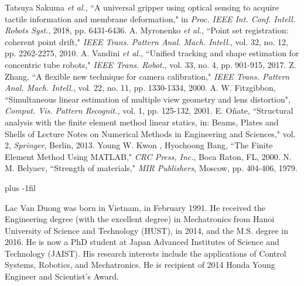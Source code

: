 \documentclass[10pt,letterpaper,journal,final,twoside,twocolumn,nofonttune]{IEEEtran}
\begin{document}
\begin{thebibliography}{1}
Tatsuya Sakuma \emph{et al.}, ``A universal gripper using optical sensing to acquire tactile information and membrane deformation," in \emph{Proc. IEEE Int. Conf. Intell. Robots Syst.}, 2018, pp. 6431-6436.
A. Myronenko \emph{et al.}, ``Point set registration: coherent point drift," \emph{IEEE Trans. Pattern Anal. Mach. Intell.}, vol. 32, no. 12, pp. 2262-2275, 2010.
A. Vandini \emph{et al.}, ``Unified tracking and shape estimation for concentric tube robots," \emph{IEEE Trans. Robot.}, vol. 33, no. 4, pp. 901-915, 2017.
Z. Zhang, ``A flexible new technique for camera calibration," \emph{IEEE Trans. Pattern Anal. Mach. Intell.}, vol. 22, no. 11, pp. 1330-1334, 2000.
A. W. Fitzgibbon, ``Simultaneous linear estimation of multiple view geometry and lens distortion", \emph{Comput. Vis. Pattern Recognit.,} vol. 1, pp. 125-132, 2001.
E. Oñate, ``Structural analysis with the finite element method linear statics, in: Beams, Plates and Shells of Lecture Notes on Numerical Methods  in  Engineering  and  Sciences,"  vol.  2,  \emph{Springer},  Berlin,  2013.
Young W. Kwon , Hyochoong Bang, ``The Finite Element Method Using MATLAB," \emph{CRC Press, Inc.}, Boca Raton, FL, 2000.
N. M. Belyaev, ``Strength of materials," \emph{MIR Publishers}, Moscow,  pp. 404-406, 1979. %
\end{thebibliography}
% 
\baselineskip plus -1fil
\begin{IEEEbiography}{Lac Van Duong} 
was born in Vietnam, in February 1991. He received the Engineering  degree (with the excellent degree) in Mechatronics from Hanoi University of Science and Technology (HUST), in 2014, and the M.S. degree in 2016. He is now a PhD student at Japan Advanced Institutes of Science and Technology (JAIST). His research interests include the applications of Control Systems, Robotics, and Mechatronics. He is recipient of 2014 Honda Young Engineer and Scientist’s Award.
\end{IEEEbiography}
\end{document}
